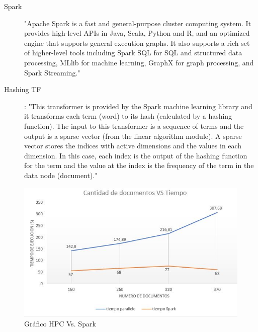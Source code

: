 \documentclass[fleqn,10pt]{SelfArx} %
\begin{document}
\begin{description}
	\item[Spark] "Apache Spark is a fast and general-purpose cluster computing system. It provides high-level APIs in Java, Scala, Python and R, and an optimized engine that supports general execution graphs. It also supports a rich set of higher-level tools including Spark SQL for SQL and structured data processing, MLlib for machine learning, GraphX for graph processing, and Spark Streaming." \cite{spark}
	
	\item[Hashing TF]: "This transformer is provided by the Spark machine learning library and it transforms each term (word) to its hash (calculated by a hashing function). The input to this transformer is a sequence of terms and the output is a sparse vector (from the linear algorithm module). A sparse vector stores the indices with active dimensions and the values in each dimension. In this case, each index is the output of the hashing function for the term and the value at the index is the frequency of the term in the data node (document)." \cite{tfidf_vectorization_spark}
	
	
\end{description}




 \begin{figure}[ht]\centering %
	\includegraphics[width=\linewidth]{graficaParalellovsSpark}
	\caption{Gráfico HPC Vs. Spark}
	\label{fig:graficoParaleloVsSpark}
\end{figure}
\end{document}
